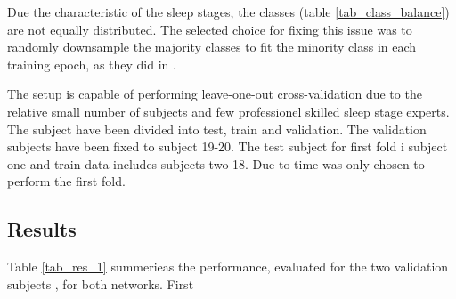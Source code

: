 Due the characteristic of the sleep stages, the classes (table \ref{tab_class_balance}) are not equally distributed. The selected choice for fixing this issue was to randomly downsample the majority classes to fit the minority class in each training epoch, as they did in \cite{main_ar}. 

The setup is capable of performing leave-one-out cross-validation due to the relative small number of subjects and few professionel skilled sleep stage experts.
The subject have been divided into test, train and validation. The validation subjects have been fixed to subject 19-20. The test subject for first fold i subject one and train data includes subjects two-18. Due to time was only chosen to perform the first fold.

\subsection{Results}
\label{subsec:results}

Table \ref{tab_res_1} summerieas the performance, evaluated for the two validation subjects , for both networks. First 


